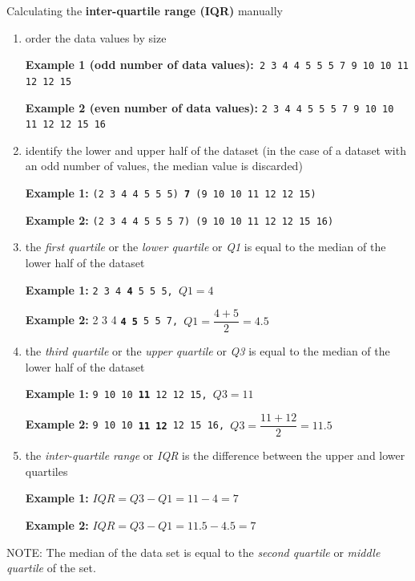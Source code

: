 \begin{howto}{Calculating the \textbf{inter-quartile range (IQR)} manually}{
  \begin{enumerate}
  \item order the data values by size
    
    \textbf{\color{darkgray} Example 1 (odd number of  data values):}\texttt{ 2 3 4 4 5 5 5 7 9 10 10 11 12 12 15}

    \textbf{\color{darkgray} Example 2 (even number of  data values):} \texttt{2 3 4 4 5 5 5 7 9 10 10 11 12 12 15 16}

  \item identify the lower and upper half of the dataset (in the case of a dataset with an odd number of values, the median value is discarded)

    \textbf{\color{darkgray} Example 1:} \texttt{(2 3 4 4 5 5 5) \textbf{7} (9 10 10 11 12 12 15)}

    \textbf{\color{darkgray} Example 2:} \texttt{(2 3 4 4 5 5 5 7) (9 10 10 11 12 12 15 16)}

  \item the \emph{first quartile} or the \emph{lower quartile} or \emph{Q1} is equal to the median of the lower half of the dataset

    \textbf{\color{darkgray} Example 1:} \texttt{2 3 4 \textbf{4} 5 5 5, $Q1 = 4$}

    \textbf{\color{darkgray} Example 2:} 2 3 4 \texttt{\textbf{4 5} 5 5 7, $Q1 = \dfrac{4+5}{2}=4.5$}
    
  \item the \emph{third quartile} or the \emph{upper quartile} or \emph{Q3} is equal to the median of the lower half of the dataset

    \textbf{\color{darkgray} Example 1:} \texttt{9 10 10 \textbf{11} 12 12 15, $Q3 = 11$}

    \textbf{\color{darkgray} Example 2:} \texttt{9 10 10 \textbf{11 12} 12 15 16, $Q3 = \dfrac{11+12}{2}=11.5$}

  \item the \emph{inter-quartile range} or \emph{IQR} is the difference between the upper and lower quartiles

    \textbf{\color{darkgray} Example 1:} \texttt{$IQR = Q3 - Q1 = 11-4 = 7$}

    \textbf{\color{darkgray} Example 2:} \texttt{$IQR = Q3 - Q1 = 11.5-4.5= 7$}
  \end{enumerate}
  NOTE: The median of the data set is equal to the \emph{second quartile} or \emph{middle quartile} of the set.}{}{}
\end{howto}
